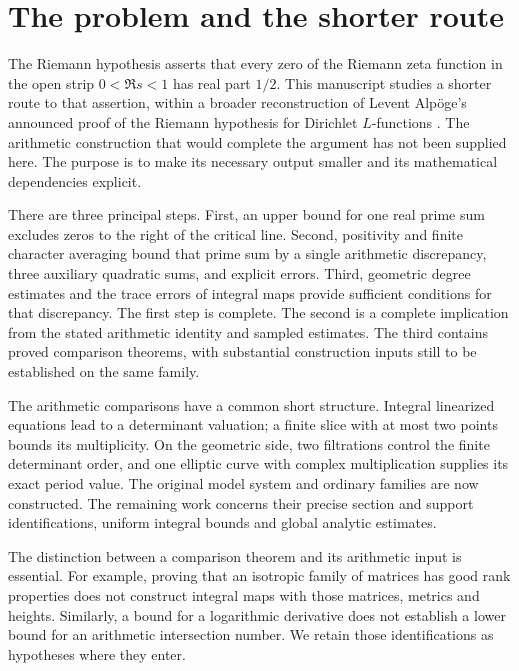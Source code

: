 \section{The problem and the shorter route}
\label{rh-purpose}

The Riemann hypothesis asserts that every zero of the Riemann zeta
function in the open strip $0<\Re s<1$ has real part $1/2$. This
manuscript studies a shorter route to that assertion, within a broader
reconstruction of Levent Alp\"oge's announced proof of the Riemann
hypothesis for Dirichlet $L$-functions \cite{rh-alpoge,rh-companion}.
The arithmetic construction that would complete the argument has not
been supplied here. The purpose is to make its necessary output smaller
and its mathematical dependencies explicit.

There are three principal steps. First, an upper bound for one real
prime sum excludes zeros to the right of the critical line. Second,
positivity and finite character averaging bound that prime sum by a
single arithmetic discrepancy, three auxiliary quadratic sums, and
explicit errors. Third, geometric degree estimates and the trace errors of
integral maps provide sufficient conditions for that discrepancy.
The first step is complete. The second is a complete implication from
the stated arithmetic identity and sampled estimates. The third contains
proved comparison theorems, with substantial construction inputs still
to be established on the same family.

The arithmetic comparisons have a common short structure. Integral
linearized equations lead to a determinant valuation; a finite slice
with at most two points bounds its multiplicity. On the geometric side,
two filtrations control the finite determinant order, and one elliptic
curve with complex multiplication supplies its exact period value.
The original model system and ordinary families are now constructed.
The remaining work concerns their precise section and support
identifications, uniform integral bounds and global analytic estimates.

The distinction between a comparison theorem and its arithmetic input is
essential. For example, proving that an isotropic family of matrices
has good rank properties does not construct integral maps with those
matrices, metrics and heights. Similarly, a bound for a logarithmic
derivative does not establish a lower bound for an arithmetic
intersection number. We retain those identifications as hypotheses
where they enter.



